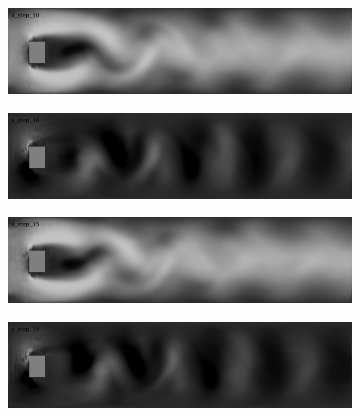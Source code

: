 \documentclass{llncs}
\begin{document}
\begin{figure}[H]
  \begin{subfigure}{.5\textwidth}
    \centering
    \includegraphics[width=1\linewidth]{imgs/sims/constant/x_step_10}  
  \end{subfigure}
  \begin{subfigure}{.5\textwidth}
    \centering
    \includegraphics[width=1\linewidth]{imgs/sims/constant/y_step_10}  
  \end{subfigure}
  
  \begin{subfigure}{.5\textwidth}
    \centering
    \includegraphics[width=1\linewidth]{imgs/sims/constant/x_step_15}  
  \end{subfigure}
  \begin{subfigure}{.5\textwidth}
    \centering
    \includegraphics[width=1\linewidth]{imgs/sims/constant/y_step_15}  
  \end{subfigure}
  

\end{figure}
\end{document}
